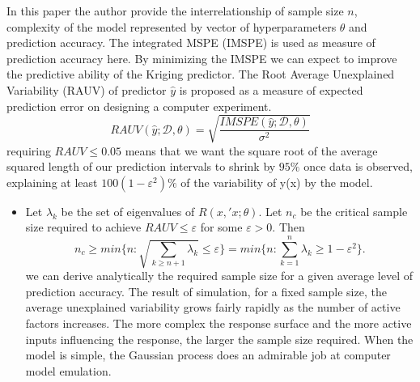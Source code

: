 \documentclass[
11pt, %
english, %
singlespacing, %
headsepline, %
]{MastersDoctoralThesis} %
\begin{document}
\begin{enumerate}
In this paper the author provide the interrelationship of sample size $n$, complexity of the model represented by vector of hyperparameters $\theta$ and prediction accuracy. The integrated MSPE (IMSPE) is used as measure of prediction accuracy here.  By minimizing the IMSPE we can expect to improve the predictive ability of the Kriging predictor. The Root Average Unexplained Variability (RAUV) of predictor $\hat{y}$ is proposed as a measure of expected prediction error on designing
a computer experiment.
$$RAUV(\hat{y};\mathscr{D},\theta)=\sqrt{\frac{IMSPE(\hat{y};\mathscr{D},\theta)}{\sigma^2}}$$
 requiring $RAUV\le 0.05$ means that we want the square root of the average squared
length of our prediction intervals to shrink by $95\%$ once data is observed, explaining at least $100(1-{\varepsilon}^{2})\%$ of the variability of y(x) by the model.
\begin{itemize}
\item Let ${\lambda_k}$ be the set of eigenvalues of $R (x, \prime{x} ; \theta)$. Let $n_c$ be the
critical sample size required to achieve $RAUV \le \varepsilon$ for some $\varepsilon >0$. Then 
$$n_c \ge min\{n: \sqrt{\sum_{k\ge n+1}\lambda_k}\le\varepsilon\}=min\{n:\sum^{n}_{k=1}\lambda_k\ge1-\varepsilon^2\}.$$
we can derive analytically the required sample size for a given average level of prediction accuracy.
The result of simulation, for a fixed sample size, the average unexplained variability grows fairly rapidly as the number of active factors increases. The more complex the response surface and the more active inputs influencing the response, the larger the sample size required. When the model is simple, the Gaussian process does an admirable job at computer model emulation.
\end{itemize}

\end{enumerate}
\end{document}
